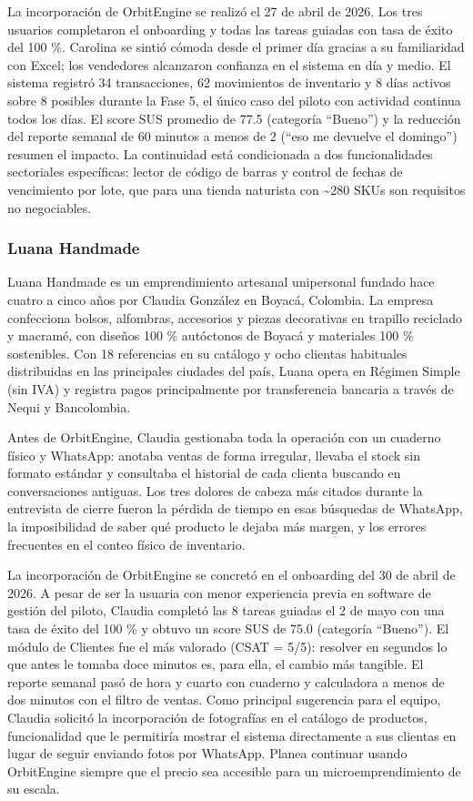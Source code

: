 La incorporación de OrbitEngine se realizó el 27 de abril de 2026. Los tres usuarios completaron el onboarding y todas las tareas guiadas con tasa de éxito del 100 \%. Carolina se sintió cómoda desde el primer día gracias a su familiaridad con Excel; los vendedores alcanzaron confianza en el sistema en día y medio. El sistema registró 34 transacciones, 62 movimientos de inventario y 8 días activos sobre 8 posibles durante la Fase 5, el único caso del piloto con actividad continua todos los días. El score SUS promedio de 77.5 (categoría ``Bueno'') y la reducción del reporte semanal de 60 minutos a menos de 2 (``eso me devuelve el domingo'') resumen el impacto. La continuidad está condicionada a dos funcionalidades sectoriales específicas: lector de código de barras y control de fechas de vencimiento por lote, que para una tienda naturista con \textasciitilde280 SKUs son requisitos no negociables.

\subsubsection{Luana Handmade}\label{luana-handmade}

Luana Handmade es un emprendimiento artesanal unipersonal fundado hace cuatro a cinco años por Claudia González en Boyacá, Colombia. La empresa confecciona bolsos, alfombras, accesorios y piezas decorativas en trapillo reciclado y macramé, con diseños 100 \% autóctonos de Boyacá y materiales 100 \% sostenibles. Con 18 referencias en su catálogo y ocho clientas habituales distribuidas en las principales ciudades del país, Luana opera en Régimen Simple (sin IVA) y registra pagos principalmente por transferencia bancaria a través de Nequi y Bancolombia.

Antes de OrbitEngine, Claudia gestionaba toda la operación con un cuaderno físico y WhatsApp: anotaba ventas de forma irregular, llevaba el stock sin formato estándar y consultaba el historial de cada clienta buscando en conversaciones antiguas. Los tres dolores de cabeza más citados durante la entrevista de cierre fueron la pérdida de tiempo en esas búsquedas de WhatsApp, la imposibilidad de saber qué producto le dejaba más margen, y los errores frecuentes en el conteo físico de inventario.

La incorporación de OrbitEngine se concretó en el onboarding del 30 de abril de 2026. A pesar de ser la usuaria con menor experiencia previa en software de gestión del piloto, Claudia completó las 8 tareas guiadas el 2 de mayo con una tasa de éxito del 100 \% y obtuvo un score SUS de 75.0 (categoría ``Bueno''). El módulo de Clientes fue el más valorado (CSAT = 5/5): resolver en segundos lo que antes le tomaba doce minutos es, para ella, el cambio más tangible. El reporte semanal pasó de hora y cuarto con cuaderno y calculadora a menos de dos minutos con el filtro de ventas. Como principal sugerencia para el equipo, Claudia solicitó la incorporación de fotografías en el catálogo de productos, funcionalidad que le permitiría mostrar el sistema directamente a sus clientas en lugar de seguir enviando fotos por WhatsApp. Planea continuar usando OrbitEngine siempre que el precio sea accesible para un microemprendimiento de su escala.

